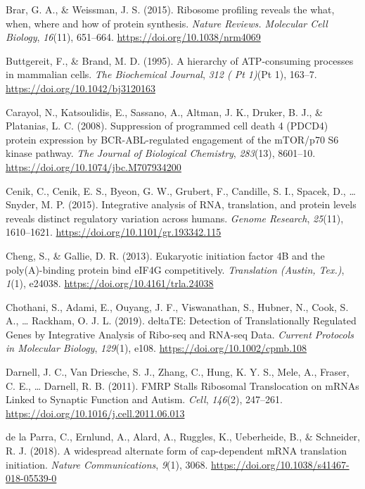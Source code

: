 \documentclass[12pt,openany]{book}
\begin{document}
\hypertarget{ref-Brar2015}{}
Brar, G. A., \& Weissman, J. S. (2015). Ribosome profiling reveals the
what, when, where and how of protein synthesis. \emph{Nature Reviews.
Molecular Cell Biology}, \emph{16}(11), 651--664.
\url{https://doi.org/10.1038/nrm4069}

\hypertarget{ref-Buttgereit1995}{}
Buttgereit, F., \& Brand, M. D. (1995). A hierarchy of ATP-consuming
processes in mammalian cells. \emph{The Biochemical Journal}, \emph{312
( Pt 1)}(Pt 1), 163--7. \url{https://doi.org/10.1042/bj3120163}

\hypertarget{ref-Carayol2008}{}
Carayol, N., Katsoulidis, E., Sassano, A., Altman, J. K., Druker, B. J.,
\& Platanias, L. C. (2008). Suppression of programmed cell death 4
(PDCD4) protein expression by BCR-ABL-regulated engagement of the
mTOR/p70 S6 kinase pathway. \emph{The Journal of Biological Chemistry},
\emph{283}(13), 8601--10. \url{https://doi.org/10.1074/jbc.M707934200}

\hypertarget{ref-Cenik2015}{}
Cenik, C., Cenik, E. S., Byeon, G. W., Grubert, F., Candille, S. I.,
Spacek, D., \ldots{} Snyder, M. P. (2015). Integrative analysis of RNA,
translation, and protein levels reveals distinct regulatory variation
across humans. \emph{Genome Research}, \emph{25}(11), 1610--1621.
\url{https://doi.org/10.1101/gr.193342.115}

\hypertarget{ref-Cheng2013}{}
Cheng, S., \& Gallie, D. R. (2013). Eukaryotic initiation factor 4B and
the poly(A)-binding protein bind eIF4G competitively. \emph{Translation
(Austin, Tex.)}, \emph{1}(1), e24038.
\url{https://doi.org/10.4161/trla.24038}

\hypertarget{ref-Chothani2019}{}
Chothani, S., Adami, E., Ouyang, J. F., Viswanathan, S., Hubner, N.,
Cook, S. A., \ldots{} Rackham, O. J. L. (2019). deltaTE: Detection of
Translationally Regulated Genes by Integrative Analysis of Ribo-seq and
RNA-seq Data. \emph{Current Protocols in Molecular Biology},
\emph{129}(1), e108. \url{https://doi.org/10.1002/cpmb.108}

\hypertarget{ref-Darnell2011}{}
Darnell, J. C., Van Driesche, S. J., Zhang, C., Hung, K. Y. S., Mele,
A., Fraser, C. E., \ldots{} Darnell, R. B. (2011). FMRP Stalls Ribosomal
Translocation on mRNAs Linked to Synaptic Function and Autism.
\emph{Cell}, \emph{146}(2), 247--261.
\url{https://doi.org/10.1016/j.cell.2011.06.013}

\hypertarget{ref-delaParra2018}{}
de la Parra, C., Ernlund, A., Alard, A., Ruggles, K., Ueberheide, B., \&
Schneider, R. J. (2018). A widespread alternate form of cap-dependent
mRNA translation initiation. \emph{Nature Communications}, \emph{9}(1),
3068. \url{https://doi.org/10.1038/s41467-018-05539-0}
\end{document}
